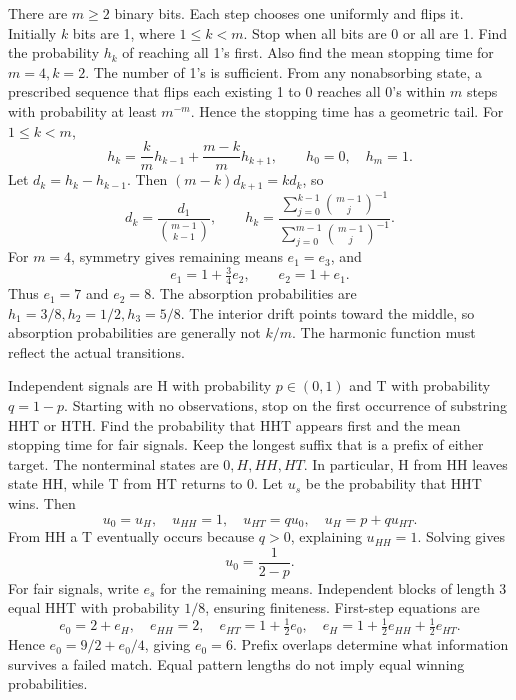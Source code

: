 There are $m\ge2$ binary bits. Each step chooses one uniformly and flips it. Initially $k$ bits are 1, where $1\le k<m$. Stop when all bits are 0 or all are 1. Find the probability $h_k$ of reaching all 1's first. Also find the mean stopping time for $m=4,k=2$.
\solution The number of 1's is sufficient. From any nonabsorbing state, a prescribed sequence that flips each existing 1 to 0 reaches all 0's within $m$ steps with probability at least $m^{-m}$. Hence the stopping time has a geometric tail. For $1\le k<m$,
\[
 h_k=\frac{k}{m}h_{k-1}+\frac{m-k}{m}h_{k+1},
 \qquad h_0=0,\quad h_m=1.
\]
Let $d_k=h_k-h_{k-1}$. Then $(m-k)d_{k+1}=kd_k$, so
\[
 d_k=\frac{d_1}{\binom{m-1}{k-1}},\qquad
 \boxed{h_k=\frac{\displaystyle\sum_{j=0}^{k-1}\binom{m-1}{j}^{-1}}
 {\displaystyle\sum_{j=0}^{m-1}\binom{m-1}{j}^{-1}}}.
\]
For $m=4$, symmetry gives remaining means $e_1=e_3$, and
\[
 e_1=1+\tfrac34e_2,\qquad e_2=1+e_1.
\]
Thus $e_1=7$ and $\boxed{e_2=8}$. The absorption probabilities are $h_1=3/8,h_2=1/2,h_3=5/8$.
\insight The interior drift points toward the middle, so absorption probabilities are generally not $k/m$. The harmonic function must reflect the actual transitions.

Independent signals are H with probability $p\in(0,1)$ and T with probability $q=1-p$. Starting with no observations, stop on the first occurrence of substring HHT or HTH. Find the probability that HHT appears first and the mean stopping time for fair signals.
\solution Keep the longest suffix that is a prefix of either target. The nonterminal states are $0,H,HH,HT$. In particular, H from HH leaves state HH, while T from HT returns to 0. Let $u_s$ be the probability that HHT wins. Then
\[
 u_0=u_H,\quad u_{HH}=1,\quad u_{HT}=qu_0,
 \quad u_H=p+qu_{HT}.
\]
From HH a T eventually occurs because $q>0$, explaining $u_{HH}=1$. Solving gives
\[
 \boxed{u_0=\frac1{2-p}}.
\]
For fair signals, write $e_s$ for the remaining means. Independent blocks of length 3 equal HHT with probability $1/8$, ensuring finiteness. First-step equations are
\[
 e_0=2+e_H,\quad e_{HH}=2,\quad
 e_{HT}=1+\tfrac12e_0,\quad
 e_H=1+\tfrac12e_{HH}+\tfrac12e_{HT}.
\]
Hence $e_0=9/2+e_0/4$, giving $\boxed{e_0=6}$.
\insight Prefix overlaps determine what information survives a failed match. Equal pattern lengths do not imply equal winning probabilities.

